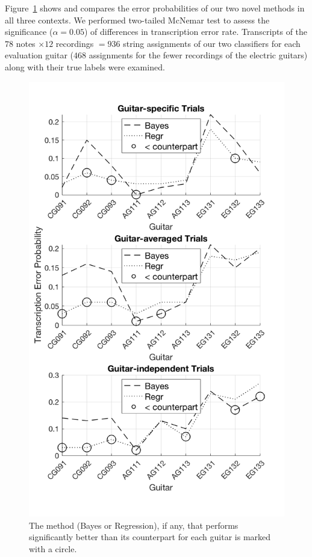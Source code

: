 \documentclass[convention,peer-reviewed]{aesconf}
\begin{document}
Figure~\ref{fig:novel-methods-sig-comp} shows and compares the error probabilities of our two novel methods in all three contexts. We performed two-tailed McNemar test to assess the significance ($\alpha = 0.05$) of differences in transcription error rate. Transcripts of the $78$ notes $\times 12$ recordings $= 936$ string assignments of our two classifiers for each evaluation guitar ($468$ assignments for the fewer recordings of the electric guitars) along with their true labels were examined.

\begin{figure}[!htbp]
\centering
\includegraphics[scale=0.275]{novel-methods-sig-comp}
\caption{The method (Bayes or Regression), if any, that performs significantly better than its counterpart for each guitar is marked with a circle.}
\label{fig:novel-methods-sig-comp}
\end{figure}
\end{document}

